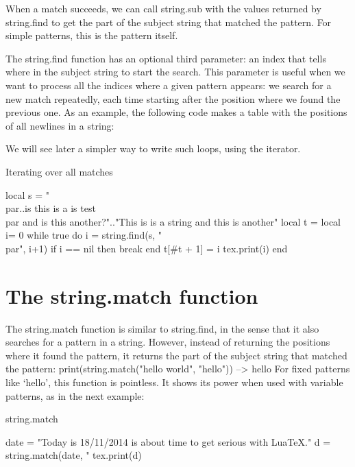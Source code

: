 When a match succeeds, we can call string.sub with the values returned by
string.find to get the part of the subject string that matched the pattern. For
simple patterns, this is the pattern itself.

The string.find function has an optional third parameter: an index that
tells where in the subject string to start the search. This parameter is useful
when we want to process all the indices where a given pattern appears: we
search for a new match repeatedly, each time starting after the position where
we found the previous one. As an example, the following code makes a table
with the positions of all newlines in a string:

We will see later a simpler way to write such loops, using the 
iterator.

\begin{texexample}{Iterating over all matches}{}
\edef\tempstring{\string\\par..is this is a is test \string\\par and is this another?}
\begin{luacode}
local s = "\tempstring".."This is is a string and this is another"
local t = {}
local i= 0
while true do
    i = string.find(s, "\\par", i+1)
    if i == nil then break end
    t[#t + 1] = i
    tex.print(i)
end
   
\end{luacode}
\end{texexample}


\section{The string.match function}


The string.match function is similar to string.find, in the sense that it also
searches for a pattern in a string. However, instead of returning the positions
where it found the pattern, it returns the part of the subject string that matched
the pattern:
print(string.match("hello world", "hello")) --> hello
For fixed patterns like ‘hello’, this function is pointless. It shows its power when
used with variable patterns, as in the next example:

\begin{texexample}{string.match}{}
\begin{luacode}
date = "Today is 18/11/2014 is about time to get serious with LuaTeX."
d = string.match(date, "%
tex.print(d) 
\end{luacode}
\end{texexample}

